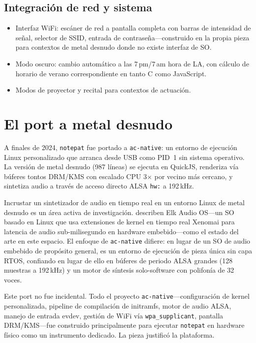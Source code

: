 \documentclass[10pt,letterpaper,twocolumn]{article}
\begin{document}
\subsection{Integración de red y sistema}

\begin{itemize}
  \item Interfaz WiFi: escáner de red a pantalla completa con barras de intensidad de señal, selector de SSID, entrada de contraseña---construido en la propia pieza para contextos de metal desnudo donde no existe interfaz de SO.
  \item Modo oscuro: cambio automático a las 7\,pm/7\,am hora de LA, con cálculo de horario de verano correspondiente en tanto C como JavaScript.
  \item Modos de proyector y recital para contextos de actuación.
\end{itemize}

\section{El port a metal desnudo}

A finales de 2024, \texttt{notepat} fue portado a \texttt{ac-native}: un entorno de ejecución Linux personalizado que arranca desde USB como PID~1 sin sistema operativo. La versión de metal desnudo (987 líneas) se ejecuta en QuickJS, renderiza vía búferes tontos DRM/KMS con escalado CPU 3$\times$ por vecino más cercano, y sintetiza audio a través de acceso directo ALSA \texttt{hw:} a 192\,kHz.

Incrustar un sintetizador de audio en tiempo real en un entorno Linux de metal desnudo es un área activa de investigación. \citet{turchet2021elk} describen Elk Audio OS---un SO basado en Linux que usa extensiones de kernel en tiempo real Xenomai para latencia de audio sub-milisegundo en hardware embebido---como el estado del arte en este espacio. El enfoque de \texttt{ac-native} difiere: en lugar de un SO de audio embebido de propósito general, es un entorno de ejecución de pieza única sin capa RTOS, confiando en lugar de ello en búferes de periodo ALSA grandes (128 muestras a 192\,kHz) y un motor de síntesis solo-software con polifonía de 32 voces.

Este port no fue incidental. Todo el proyecto \texttt{ac-native}---configuración de kernel personalizada, pipeline de compilación de initramfs, motor de audio ALSA, manejo de entrada evdev, gestión de WiFi vía \texttt{wpa\_supplicant}, pantalla DRM/KMS---fue construido principalmente para ejecutar \texttt{notepat} en hardware físico como un instrumento dedicado. La pieza justificó la plataforma.
\end{document}
